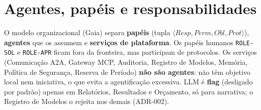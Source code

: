 \documentclass[10pt,a4paper]{article}
\newcommand{\code}[1]{\texttt{#1}}
\begin{document}
\section{Agentes, papéis e responsabilidades}
O modelo organizacional (Gaia) separa \textbf{papéis} (tupla $\langle Resp, Perm, Obl, Prot\rangle$),
\textbf{agentes} que os assumem e \textbf{serviços de plataforma}. Os papéis humanos \code{ROLE-SOL} e
\code{ROLE-APR} ficam fora da fronteira, mas participam de protocolos. Os serviços (Comunicação A2A, Gateway MCP,
Auditoria, Registro de Modelos, Memória, Política de Segurança, Reserva de Período) \textbf{não são agentes}: não têm
objetivo local nem iniciativa, o que evita a agentificação excessiva. LLM é \textbf{flag} (desligado por padrão)
apenas em Relatórios, Resultados e Orçamento, só para narrativa; o Registro de Modelos o rejeita nos demais (ADR-002).
\end{document}
